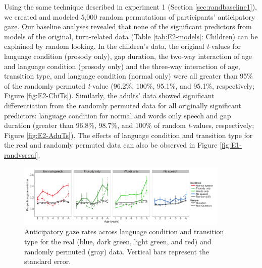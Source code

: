 \documentclass[authoryear, 12pt]{elsarticle}
\begin{document}
Using the same technique described in experiment 1 (Section \ref{sec:randbaseline1}), we created and modeled 5,000 random permutations of participants' anticipatory gaze. Our baseline analyses revealed that none of the significant predictors from models of the original, turn-related data (Table \ref{tab:E2-models}: Children) can be explained by random looking. In the children's data, the original \textit{t}-values for language condition (prosody only), gap duration, the two-way interaction of age and language condition (prosody only) and the three-way interaction of age, transition type, and language condition (normal only) were all greater than 95\% of the randomly permuted \textit{t}-value (96.2\%, 100\%, 95.1\%, and 95.1\%, respectively; Figure \ref{fig:E2-ChiTs}). Similarly, the adults' data showed significant differentiation from the randomly permuted data for all originally significant predictors: language condition for normal and words only speech and gap duration (greater than 96.8\%, 98.7\%, and 100\% of random \textit{t}-values, respectively; Figure \ref{fig:E2-AduTs}). The effects of language condition and transition type for the real and randomly permuted data can also be observed in Figure \ref{fig:E1-randvsreal}.


\begin{figure}[h]
\begin{center}
\includegraphics[width=0.9\textwidth]{figures/E2-samples-by-lang-groups-trans-types.png}
\end{center}
\caption{Anticipatory gaze rates across language condition and transition type for the real (blue, dark green, light green, and red) and randomly permuted (gray) data. Vertical bars represent the standard error.} 
\label{fig:E2-randvsreal}
\end{figure}
\end{document}
